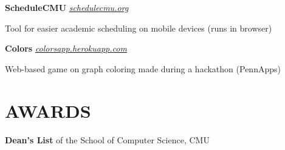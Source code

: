 \documentclass[margin, 11pt]{res} %
\begin{document}
\begin{resume}
{\bf ScheduleCMU} \href{www.schedulecmu.org}{\sl schedulecmu.org}

\begin{itemize} \itemsep -2pt
{\small \item Tool for easier academic scheduling on mobile devices (runs in browser)}
\end{itemize}

\vspace{3pt}

{\bf Colors} \href{colorsapp.herokuapp.com}{\sl colorsapp.herokuapp.com}
\begin{itemize} \itemsep -2pt
{\small \item Web-based game on graph coloring made during a hackathon (PennApps)}
\end{itemize}




\section{AWARDS}

{\bf Dean's List} of the School of Computer Science, CMU


\end{resume}
\end{document}
